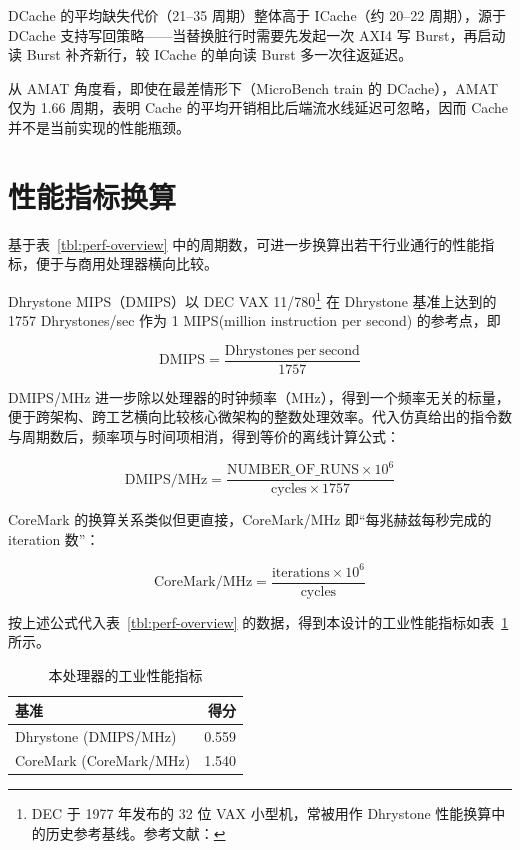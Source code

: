 DCache 的平均缺失代价（21--35 周期）整体高于 ICache（约 20--22 周期），源于 DCache 支持写回策略——当替换脏行时需要先发起一次 AXI4 写 Burst，再启动读 Burst 补齐新行，较 ICache 的单向读 Burst 多一次往返延迟。

从 AMAT 角度看，即使在最差情形下（MicroBench train 的 DCache），AMAT 仅为 1.66 周期，表明 Cache 的平均开销相比后端流水线延迟可忽略，因而 Cache 并不是当前实现的性能瓶颈。

\section{性能指标换算}

基于表~\ref{tbl:perf-overview} 中的周期数，可进一步换算出若干行业通行的性能指标，便于与商用处理器横向比较。

Dhrystone MIPS（DMIPS）以 DEC VAX 11/780\footnote{DEC 于 1977 年发布的 32 位 VAX 小型机，常被用作 Dhrystone 性能换算中的历史参考基线。参考文献：\cite{strecker1978vax11780}} 在 Dhrystone 基准上达到的 1757 Dhrystones/sec 作为 1 MIPS(million instruction per second) 的参考点，即

\[
\mathrm{DMIPS} = \frac{\mathrm{Dhrystones\ per\ second}}{1757}
\]

DMIPS/MHz 进一步除以处理器的时钟频率（MHz），得到一个频率无关的标量，便于跨架构、跨工艺横向比较核心微架构的整数处理效率。代入仿真给出的指令数与周期数后，频率项与时间项相消，得到等价的离线计算公式：

\[
\mathrm{DMIPS/MHz} = \frac{\mathrm{NUMBER\_OF\_RUNS} \times 10^6}{\mathrm{cycles} \times 1757}
\]

CoreMark 的换算关系类似但更直接，CoreMark/MHz 即“每兆赫兹每秒完成的 iteration 数”：

\[
\mathrm{CoreMark/MHz} = \frac{\mathrm{iterations} \times 10^6}{\mathrm{cycles}}
\]

按上述公式代入表~\ref{tbl:perf-overview} 的数据，得到本设计的工业性能指标如表~\ref{tbl:perf-industrial} 所示。

\begin{table}[H]
  \centering
  \caption{本处理器的工业性能指标}
  \label{tbl:perf-industrial}
  \begin{tabular}{lr}
    \toprule
    基准 & 得分 \\
    \midrule
    Dhrystone (DMIPS/MHz) & 0.559 \\
    CoreMark (CoreMark/MHz) & 1.540 \\
    \bottomrule
  \end{tabular}
\end{table}

